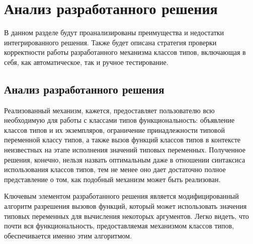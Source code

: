 \chapter{Анализ разработанного решения}

В данном разделе будут проанализированы преимущества и недостатки интегрированного решения. Также будет описана стратегия проверки корректности работы разработанного механизма классов типов, включающая в себя, как автоматическое, так и ручное тестирование.  

\section{Анализ разработанного решения}

Реализованный механизм, кажется, предоставляет пользователю всю необходимую для работы с классами типов функциональность: объявление классов типов и их экземпляров, ограничение принадлежности типовой переменной классу типов, а также вызов функций классов типов в контексте неизвестных на этапе исполнения значений типовых переменных. Полученное решения, конечно, нельзя назвать оптимальным даже в отношении синтаксиса использования классов типов, тем не менее оно дает достаточно полное представление о том, как подобный механизм может быть реализован. 

Ключевым элементом разработанного решения является модифицированный алгоритм разрешения вызовов функций, который может использовать значения типовых переменных для вычисления некоторых аргументов. Легко видеть, что почти вся функциональность, предоставляемая механизмом классов типов, обеспечивается именно этим алгоритмом. 

